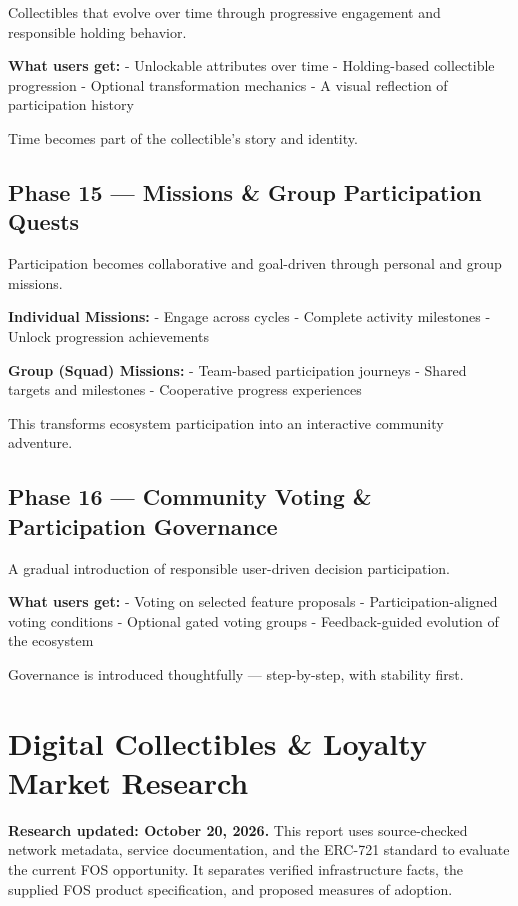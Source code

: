 \documentclass[
  10pt,
  letterpaper,
]{article}
\begin{document}
Collectibles that evolve over time through progressive engagement and
responsible holding behavior.

\textbf{What users get:} - Unlockable attributes over time -
Holding-based collectible progression - Optional transformation
mechanics - A visual reflection of participation history

Time becomes part of the collectible's story and identity.

\subsection{Phase 15 --- Missions \& Group Participation
Quests}\label{phase-15-missions-group-participation-quests}

Participation becomes collaborative and goal-driven through personal and
group missions.

\textbf{Individual Missions:} - Engage across cycles - Complete activity
milestones - Unlock progression achievements

\textbf{Group (Squad) Missions:} - Team-based participation journeys -
Shared targets and milestones - Cooperative progress experiences

This transforms ecosystem participation into an interactive community
adventure.

\subsection{Phase 16 --- Community Voting \& Participation
Governance}\label{phase-16-community-voting-participation-governance}

A gradual introduction of responsible user-driven decision
participation.

\textbf{What users get:} - Voting on selected feature proposals -
Participation-aligned voting conditions - Optional gated voting groups -
Feedback-guided evolution of the ecosystem

Governance is introduced thoughtfully --- step-by-step, with stability
first.

\section{Digital Collectibles \& Loyalty Market
Research}\label{digital-collectibles-loyalty-market-research}

\textbf{Research updated: October 20, 2026.} This report uses
source-checked network metadata, service documentation, and the ERC-721
standard to evaluate the current FOS opportunity. It separates verified
infrastructure facts, the supplied FOS product specification, and
proposed measures of adoption.
\end{document}

